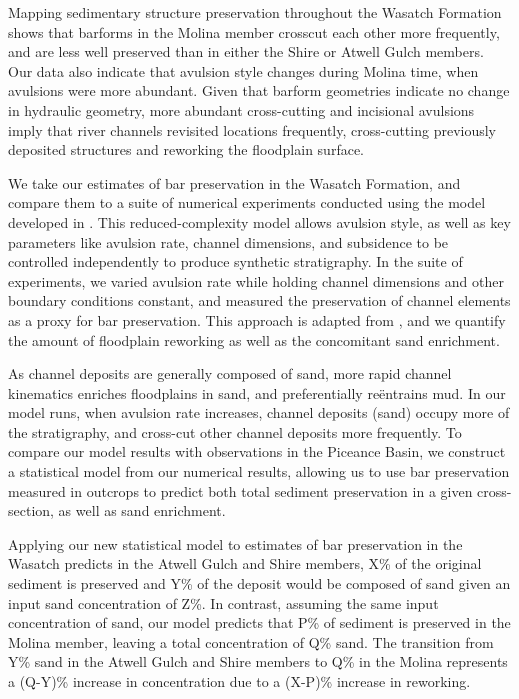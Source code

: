 \documentclass[draft]{compact_proposal}\usepackage[]{graphicx}\usepackage[]{color}
\begin{document}
Mapping sedimentary structure preservation throughout the Wasatch Formation shows that barforms in the Molina member crosscut each other more frequently, and are less well preserved than in either the Shire or Atwell Gulch members.
Our data also indicate that avulsion style changes during Molina time, when  avulsions were more abundant. 
Given that barform geometries indicate no change in hydraulic geometry, more abundant cross-cutting and incisional avulsions imply that river channels revisited locations frequently, cross-cutting previously deposited structures and reworking the floodplain surface.

We take our estimates of bar preservation in the Wasatch Formation, and compare them to a suite of numerical experiments conducted using the model developed in \textcite{chamberlin_interpreting_2015}. 
This reduced-complexity model allows avulsion style, as well as key parameters like avulsion rate, channel dimensions, and subsidence to be controlled independently to produce synthetic stratigraphy. 
In the suite of experiments, we varied avulsion rate while holding channel dimensions and other boundary conditions constant, and measured the preservation of channel elements as a proxy for bar preservation. 
This approach is adapted from \textcite{chamberlin_using_2019}, and we quantify the amount of floodplain reworking as well as the concomitant sand enrichment.

As channel deposits are generally composed of sand, more rapid channel kinematics enriches floodplains in sand, and preferentially re\"entrains mud.
In our model runs, when avulsion rate increases, channel deposits (sand) occupy more of the stratigraphy, and cross-cut other channel deposits more frequently. 
To compare our model results with observations in the Piceance Basin, we construct a statistical model from our numerical results, allowing us to use bar preservation measured in outcrops to predict both total sediment preservation in a given cross-section, as well as sand enrichment.

Applying our new statistical model to estimates of bar preservation in the Wasatch predicts in the Atwell Gulch and Shire members, X\% of the original sediment is preserved and Y\% of the deposit would be composed of sand given an input sand concentration of Z\%. 
In contrast, assuming the same input concentration of sand, our model predicts that P\% of sediment is preserved in the Molina member, leaving a total concentration of Q\% sand. 
The transition from Y\% sand in the Atwell Gulch and Shire members to Q\% in the Molina represents a (Q-Y)\% increase in concentration due to a (X-P)\% increase in reworking.
\end{document}
